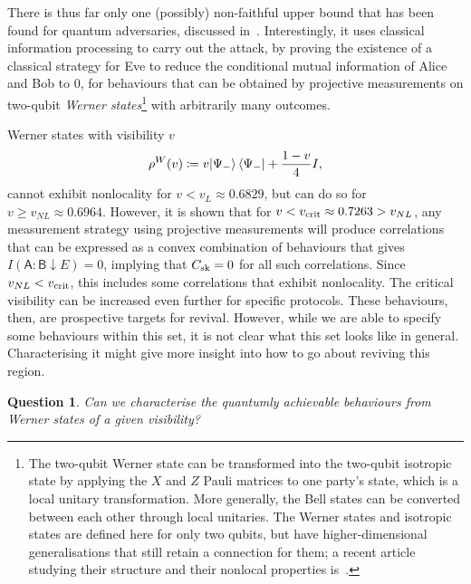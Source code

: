 \documentclass[10pt, a4paper]{article}
\numberwithin{equation}{section} %
\theoremstyle{definition}
\theoremstyle{plain}
\newtheorem{question}{Question}
\newcommand{\?}{\mathrel{?}} %
\newcommand{\crv}[1]{\mathsf{#1}}
\newcommand{\sk}{\rm sk}
\newcommand{\crit}{\rm crit}
\begin{document}

    There is thus far only one (possibly) non-faithful upper bound that has been found for quantum adversaries, discussed in~\cite{NotSufficient}. Interestingly, it uses classical information processing to carry out the attack, by proving the existence of a classical strategy for Eve to reduce the conditional mutual information of Alice and Bob to 0, for behaviours that can be obtained by projective measurements on two-qubit \emph{Werner states}\footnote{The two-qubit Werner state can be transformed into the two-qubit isotropic state by applying the \(X\) and \(Z\) Pauli matrices to one party's state, which is a local unitary transformation. More generally, the Bell states can be converted between each other through local unitaries. The Werner states and isotropic states are defined here for only two qubits, but have higher-dimensional generalisations that still retain a connection for them; a recent article studying their structure and their nonlocal properties is~\cite{WernerIsotropicDecomp}.}  with arbitrarily many outcomes.

    Werner states with visibility \(v\)
    \begin{equation}
      \rho^{W}(v) \coloneqq v{\ket{\Psi_-}\bra{\Psi_-}} + \frac{1-v}{4}I,
    \end{equation}
    cannot exhibit nonlocality for \(v < v_L \approx 0.6829\), but can do so for \(v \geq v_{NL} \approx 0.6964\). However, it is shown that for \(v < v_{\crit} \approx 0.7263 > v_{NL}\), any measurement strategy using projective measurements will produce correlations that can be expressed as a convex combination of behaviours that gives \(I(\crv{A}:\crv{B} \downarrow E) = 0\), implying that \(C_{\sk} = 0\) for all such correlations. Since \(v_{NL} < v_{\crit}\), this includes some correlations that exhibit nonlocality. The critical visibility can be increased even further for specific protocols. These behaviours, then, are prospective targets for revival. However, while we are able to specify some behaviours within this set, it is not clear what this set looks like in general. Characterising it might give more insight into how to go about reviving this region.

    \begin{question}
      Can we characterise the quantumly achievable behaviours from Werner states of a given visibility?
    \end{question}
\end{document}
